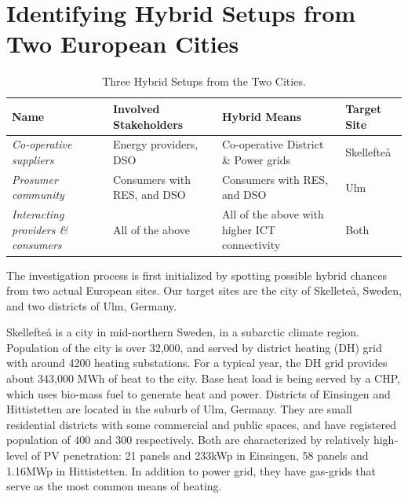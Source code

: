 \documentclass[review]{elsarticle}
\begin{document}
\section{Identifying Hybrid Setups from Two European Cities} 
\label{sec:identifying_hybrid}


\begin{table}[t]
  \small
  \centering
  \caption{Three Hybrid Setups from the Two Cities.}
  \label{tab:1}
  \begin{tabular}{|p{2cm}|p{3cm}|p{3cm}|p{2cm}|}
    \hline
    Name & Involved Stakeholders & Hybrid Means & Target Site \\ \hline
    {\em Co-operative suppliers} & Energy providers, DSO & Co-operative District \& Power grids & Skellefte\aa \\ \hline
    {\em Prosumer community} & Consumers with RES, and DSO & Consumers with RES, and DSO & Ulm \\ \hline
    {\em Interacting providers \& consumers} & All of the above & All of the above with higher ICT connectivity & Both\\ \hline  
  \end{tabular}
\end{table}
The investigation process is first initialized by spotting possible
hybrid chances from two actual European sites. 
Our target sites are the city of Skellete\aa , Sweden, and two
districts of Ulm, Germany.  

Skellefte{\aa}  is a city in mid-northern Sweden, in a subarctic
climate region. Population of the city is over 32,000, and served by
district heating (DH) grid with around 4200 heating substations. For a 
typical year, the DH grid provides about 343,000 MWh of heat to the 
city. Base heat load is being served by a CHP, which uses bio-mass
fuel to generate heat and power. 
Districts of Einsingen and Hittistetten are located in the suburb of
Ulm, Germany. They are small residential districts with some
commercial and  public spaces, and have registered population of 400
and 300 respectively. Both are characterized by relatively high-level
of PV penetration: 21 panels and 233kWp in Einsingen, 58 panels and 
1.16MWp in Hittistetten. In addition to power grid, they have
gas-grids that serve as the most common means of heating.  
\end{document}
